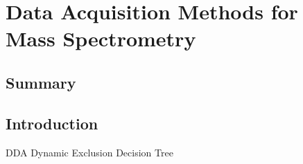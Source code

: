 \chapter{Data Acquisition Methods for Mass Spectrometry}

\section{Summary}

\section{Introduction}

DDA
Dynamic Exclusion
Decision Tree
